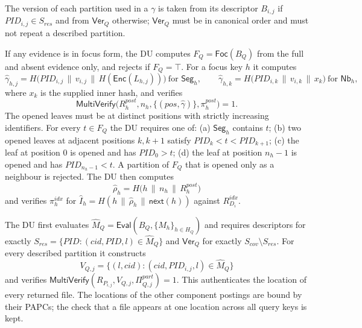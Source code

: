 The version of each partition used in a $\gamma$ is taken from its descriptor $B_{i,j}$ if
$PID_{i,j} \in S_{res}$ and from $\mathsf{Ver}_Q$ otherwise; $\mathsf{Ver}_Q$ must be in canonical order
and must not repeat a described partition.

If any evidence is in focus form, the DU computes $F_Q = \mathsf{Foc}(B_Q)$ from the full and absent
evidence only, and rejects if $F_Q = \top$. For a focus key $h$ it computes
\begin{equation}
\hat{\gamma}_{h,j} = H\big(PID_{i,j} \,\|\, v_{i,j} \,\|\, H(\mathsf{Enc}(L_{h,j}))\big)
\ \text{for } \mathsf{Seg}_h, \qquad
\hat{\gamma}_{h,k} = H\big(PID_{i,k} \,\|\, v_{i,k} \,\|\, x_k\big) \ \text{for } \mathsf{Nb}_h,
\end{equation}
where $x_k$ is the supplied inner hash, and verifies
\begin{equation}
\mathsf{MultiVerify}\big(R^{post}_h, n_h, \{(pos, \hat{\gamma})\}, \pi^{post}_h\big) = 1 .
\end{equation}
The opened leaves must be at distinct positions with strictly increasing identifiers. For every
$t \in F_Q$ the DU requires one of: (a) $\mathsf{Seg}_h$ contains $t$; (b) two opened leaves at adjacent
positions $k, k+1$ satisfy $PID_k < t < PID_{k+1}$; (c) the leaf at position $0$ is opened and has
$PID_0 > t$; (d) the leaf at position $n_h - 1$ is opened and has $PID_{n_h-1} < t$.
A partition of $F_Q$ that is opened only as a neighbour is rejected. The DU then computes
\begin{equation}
\hat{\rho}_h = H\big(h \,\|\, n_h \,\|\, R^{post}_h\big)
\end{equation}
and verifies $\pi^{idx}_h$ for $\hat{I}_h = H(h \,\|\, \hat{\rho}_h \,\|\, \mathsf{next}(h))$ against
$R^{idx}_{D_i}$.



The DU first evaluates $\hat{M}_Q = \mathsf{Eval}(B_Q, \{M_h\}_{h \in H_Q})$ and requires descriptors for
exactly $S_{res} = \{PID : (cid,PID,l) \in \hat{M}_Q\}$ and $\mathsf{Ver}_Q$ for exactly
$S_{cov} \setminus S_{res}$. For every described partition it constructs
\begin{equation}
V_{Q,j} = \{(l, cid) : (cid, PID_{i,j}, l) \in \hat{M}_Q\}
\end{equation}
and verifies $\mathsf{MultiVerify}(R_{P_{i,j}}, V_{Q,j}, \Pi^{part}_{Q,j}) = 1$.
This authenticates the location of every returned file. The locations of the other component postings
are bound by their PAPCs; the check that a file appears at one location across all query keys is kept.

